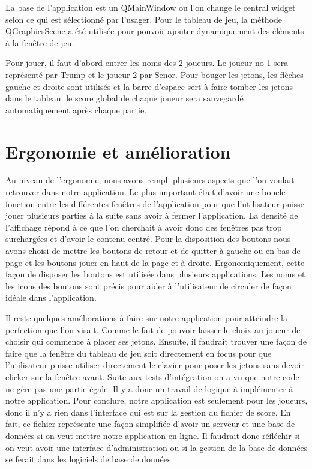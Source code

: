 La base de l’application est un QMainWindow ou l’on change le central widget selon ce qui est sélectionné par l’usager.
Pour le tableau de jeu, la méthode QGraphicsScene a été utilisée pour pouvoir ajouter dynamiquement des éléments à la fenêtre de jeu.

Pour jouer, il faut d'abord entrer les noms des 2 joueurs.
Le joueur no 1 sera représenté par Trump et le joueur 2 par Senor.
Pour bouger les jetons, les flèches gauche et droite sont utilisés et la barre d’espace sert à faire tomber les jetons dans le tableau.
le score global de chaque joueur sera sauvegardé automatiquement après chaque partie.

\section{Ergonomie et amélioration}

Au niveau de l'ergonomie, nous avons rempli plusieurs aspects que l'on voulait retrouver dans notre application.
Le plus important était d'avoir une boucle fonction entre les différentes fenêtres de l'application pour que l'utilisateur puisse jouer plusieurs parties à la suite sans avoir à fermer l'application.
La densité de l'affichage répond à ce que l'on cherchait à avoir donc des fenêtres pas trop surchargées et d'avoir le contenu centré.
Pour la disposition des boutons nous avons choisi de mettre les boutons de retour et de quitter à gauche ou en bas de page et les boutons jouer en haut de la page et à droite.
Ergonomiquement, cette façon de disposer les boutons est utilisée dans plusieurs applications.
Les noms et les icons des boutons sont précis pour aider à l'utilisateur de circuler de façon idéale dans l'application.

Il reste quelques améliorations à faire sur notre application pour atteindre la perfection que l'on visait.
Comme le fait de pouvoir laisser le choix au joueur de choisir qui commence à placer ses jetons.
Ensuite, il faudrait trouver une façon de faire que la fenêtre du tableau de jeu soit directement en focus pour que l'utilisateur puisse utiliser directement le clavier pour poser les jetons sans devoir clicker sur la fenêtre avant.
Suite aux tests d'intégration on a vu que notre code ne gère pas une partie égale.
Il y a donc un travail de logique à implémenter à notre application.
Pour conclure, notre application est seulement pour les joueurs, donc il n'y a rien dans l'interface qui est sur la gestion du fichier de score.
En fait, ce fichier représente une façon simplifiée d'avoir un serveur et une base de données si on veut mettre notre application en ligne.
Il faudrait donc réfléchir si on veut avoir une interface d'administration ou si la gestion de la base de données se ferait dans les logiciels de base de données.

